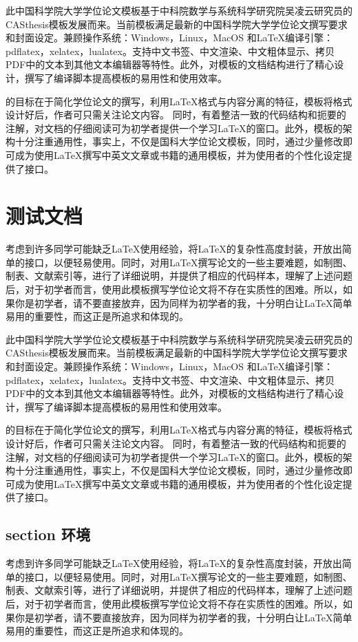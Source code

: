 \documentclass[
  fontset = mac,
]{shtthesis}
\begin{document}
此中国科学院大学学位论文模板\shtthesis 基于中科院数学与系统科学研究院吴凌云研究员的CASthesis模板发展而来。当前\shtthesis 模板满足最新的中国科学院大学学位论文撰写要求和封面设定。兼顾操作系统：Windows，Linux，MacOS 和\LaTeX{}编译引擎：pdflatex，xelatex，lualatex。支持中文书签、中文渲染、中文粗体显示、拷贝PDF中的文本到其他文本编辑器等特性。此外，对模板的文档结构进行了精心设计，撰写了编译脚本提高模板的易用性和使用效率。

\shtthesis 的目标在于简化学位论文的撰写，利用\LaTeX{}格式与内容分离的特征，模板将格式设计好后，作者可只需关注论文内容。 同时，\shtthesis 有着整洁一致的代码结构和扼要的注解，对文档的仔细阅读可为初学者提供一个学习\LaTeX{}的窗口。此外，模板的架构十分注重通用性，事实上，\shtthesis 不仅是国科大学位论文模板，同时，通过少量修改即可成为使用\LaTeX{}撰写中英文文章或书籍的通用模板，并为使用者的个性化设定提供了接口。

\chapter{\ShtThesis 测试文档}
考虑到许多同学可能缺乏\LaTeX{}使用经验，\shtthesis 将\LaTeX{}的复杂性高度封装，开放出简单的接口，以便轻易使用。同时，对用\LaTeX{}撰写论文的一些主要难题，如制图、制表、文献索引等，进行了详细说明，并提供了相应的代码样本，理解了上述问题后，对于初学者而言，使用此模板撰写学位论文将不存在实质性的困难。所以，如果你是初学者，请不要直接放弃，因为同样为初学者的我，十分明白让\LaTeX{}简单易用的重要性，而这正是\shtthesis 所追求和体现的。

此中国科学院大学学位论文模板\shtthesis 基于中科院数学与系统科学研究院吴凌云研究员的CASthesis模板发展而来。当前\shtthesis 模板满足最新的中国科学院大学学位论文撰写要求和封面设定。兼顾操作系统：Windows，Linux，MacOS 和\LaTeX{}编译引擎：pdflatex，xelatex，lualatex。支持中文书签、中文渲染、中文粗体显示、拷贝PDF中的文本到其他文本编辑器等特性。此外，对模板的文档结构进行了精心设计，撰写了编译脚本提高模板的易用性和使用效率。

\shtthesis 的目标在于简化学位论文的撰写，利用\LaTeX{}格式与内容分离的特征，模板将格式设计好后，作者可只需关注论文内容。 同时，\shtthesis 有着整洁一致的代码结构和扼要的注解，对文档的仔细阅读可为初学者提供一个学习\LaTeX{}的窗口。此外，模板的架构十分注重通用性，事实上，\shtthesis 不仅是国科大学位论文模板，同时，通过少量修改即可成为使用\LaTeX{}撰写中英文文章或书籍的通用模板，并为使用者的个性化设定提供了接口。

\section{\ShtThesis section 环境}
考虑到许多同学可能缺乏\LaTeX{}使用经验，\shtthesis 将\LaTeX{}的复杂性高度封装，开放出简单的接口，以便轻易使用。同时，对用\LaTeX{}撰写论文的一些主要难题，如制图、制表、文献索引等，进行了详细说明，并提供了相应的代码样本，理解了上述问题后，对于初学者而言，使用此模板撰写学位论文将不存在实质性的困难。所以，如果你是初学者，请不要直接放弃，因为同样为初学者的我，十分明白让\LaTeX{}简单易用的重要性，而这正是\shtthesis 所追求和体现的。
\end{document}
